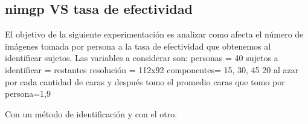 \subsection{nimgp VS tasa de efectividad}
El objetivo de la siguiente experimentación es analizar como afecta el n\'umero de imágenes tomada por persona a la tasa de efectividad
que obtenemos al identificar sujetos. Las variables a considerar son: 
personas = 40
sujetos a identificar = restantes
resolución = 112x92
componentes= 15, 30, 45
20 al azar por cada cantidad de caras y después tomo el promedio
caras que tomo por persona=1,9

Con un método de identificación y con el otro.
